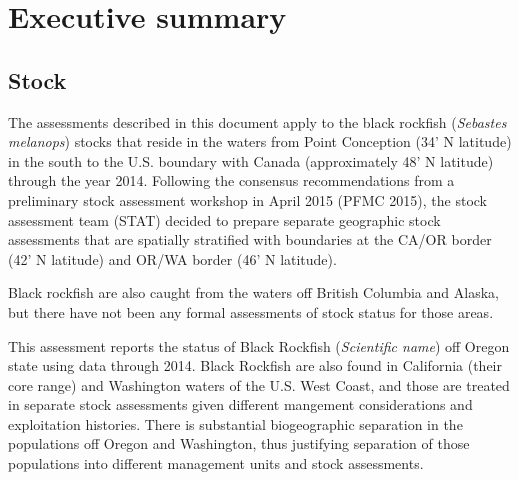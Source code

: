 \documentclass[11pt,
  english,
  letterpaper,
]{article}
\begin{document}
\newcommand{\lt}{\ensuremath <}
\newcommand{\gt}{\ensuremath >}

\vspace{500cm}

\pagebreak
{}
\setcounter{page}{1}

\renewcommand{\thetable}{\roman{table}}
\renewcommand{\thefigure}{\roman{figure}}

\setlength\parskip{0.5em plus 0.1em minus 0.2em}

\hypertarget{executive-summary}{%
\section*{Executive summary}\label{executive-summary}}

\hypertarget{stock}{%
\subsection*{Stock}\label{stock}}

The assessments described in this document apply to the black rockfish (\emph{Sebastes melanops}) stocks that reside in the waters from Point Conception (34' N latitude) in the south to the U.S. boundary with Canada (approximately 48' N latitude) through the year 2014. Following the consensus recommendations from a preliminary stock assessment workshop in April 2015 (PFMC 2015), the stock assessment team (STAT) decided to prepare separate geographic stock assessments that are spatially stratified with boundaries at the CA/OR border (42' N latitude) and OR/WA border (46' N latitude).

Black rockfish are also caught from the waters off British Columbia and Alaska, but there have not been any formal assessments of stock status for those areas.

This assessment reports the status of Black Rockfish (\emph{Scientific name}) off Oregon state using data through 2014. Black Rockfish are also found in California (their core range) and Washington waters of the U.S. West Coast, and those are treated in separate stock assessments given different mangement considerations and exploitation histories. There is substantial biogeographic separation in the populations off Oregon and Washington, thus justifying separation of those populations into different management units and stock assessments.
\end{document}
